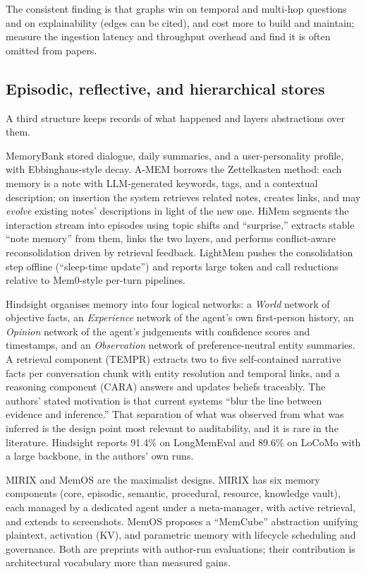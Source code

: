 \documentclass[11pt]{article}
\begin{document}
The consistent finding is that graphs win on temporal and multi-hop questions and on explainability (edges can be cited), and cost more to build and maintain; \citet{jiang2026anatomy} measure the ingestion latency and throughput overhead and find it is often omitted from papers.

\subsection{Episodic, reflective, and hierarchical stores}

A third structure keeps records of what happened and layers abstractions over them.

MemoryBank \citep{zhong2023memorybank} stored dialogue, daily summaries, and a user-personality profile, with Ebbinghaus-style decay. A-MEM \citep{xu2025amem} borrows the Zettelkasten method: each memory is a note with LLM-generated keywords, tags, and a contextual description; on insertion the system retrieves related notes, creates links, and may \emph{evolve} existing notes' descriptions in light of the new one. HiMem \citep{zhang2026himem} segments the interaction stream into episodes using topic shifts and ``surprise,'' extracts stable ``note memory'' from them, links the two layers, and performs conflict-aware reconsolidation driven by retrieval feedback. LightMem \citep{fang2025lightmem} pushes the consolidation step offline (``sleep-time update'') and reports large token and call reductions relative to Mem0-style per-turn pipelines.

Hindsight \citep{latimer2025hindsight} organises memory into four logical networks: a \emph{World} network of objective facts, an \emph{Experience} network of the agent's own first-person history, an \emph{Opinion} network of the agent's judgements with confidence scores and timestamps, and an \emph{Observation} network of preference-neutral entity summaries. A retrieval component (TEMPR) extracts two to five self-contained narrative facts per conversation chunk with entity resolution and temporal links, and a reasoning component (CARA) answers and updates beliefs traceably. The authors' stated motivation is that current systems ``blur the line between evidence and inference.'' That separation of what was observed from what was inferred is the design point most relevant to auditability, and it is rare in the literature. Hindsight reports 91.4\% on LongMemEval and 89.6\% on LoCoMo with a large backbone, in the authors' own runs.

MIRIX \citep{wang2025mirix} and MemOS \citep{li2025memos} are the maximalist designs. MIRIX has six memory components (core, episodic, semantic, procedural, resource, knowledge vault), each managed by a dedicated agent under a meta-manager, with active retrieval, and extends to screenshots. MemOS proposes a ``MemCube'' abstraction unifying plaintext, activation (KV), and parametric memory with lifecycle scheduling and governance. Both are preprints with author-run evaluations; their contribution is architectural vocabulary more than measured gains.
\end{document}
